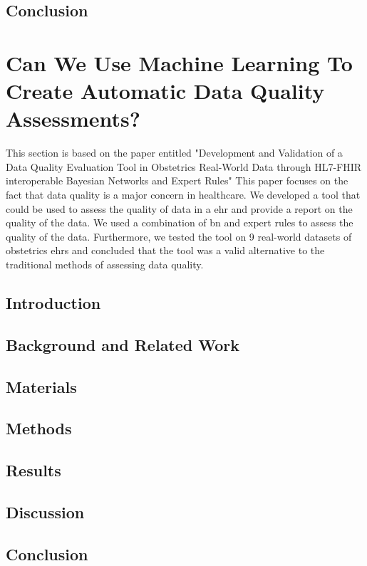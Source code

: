 \subsection{Conclusion}



\section{Can We Use Machine Learning To Create Automatic Data Quality Assessments?}\label{subsec:dq}
This section is based on the paper entitled "Development and Validation of a Data Quality Evaluation Tool in Obstetrics Real-World Data through HL7-FHIR interoperable Bayesian Networks and Expert Rules" This paper focuses on the fact that data quality is a major concern in healthcare. We developed a tool that could be used to assess the quality of data in a \ac{ehr} and provide a report on the quality of the data. We used a combination of \ac{bn} and expert rules to assess the quality of the data. Furthermore, we tested the tool on 9 real-world datasets of obstetrics \acp{ehr} and concluded that the tool was a valid alternative to the traditional methods of assessing data quality.
%
\subsection{Introduction}

\subsection{Background and Related Work}

\subsection{Materials}

\subsection{Methods}

\subsection{Results}

\subsection{Discussion}

\subsection{Conclusion}



